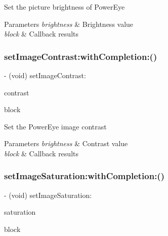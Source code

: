 Set the picture brightness of Power\+Eye


\begin{DoxyParams}{Parameters}
{\em brightness} & Brightness value \\
\hline
{\em block} & Callback results \\
\hline
\end{DoxyParams}
\mbox{\label{interface_p_v_camera_ab8dd6bc65ff3a01571c87a80bcb60b71}} 
\subsubsection{\texorpdfstring{set\+Image\+Contrast\+:with\+Completion\+:()}{setImageContrast:withCompletion:()}}
{\footnotesize\ttfamily -\/ (void) set\+Image\+Contrast\+: \begin{DoxyParamCaption}\item[{(N\+S\+Integer)}]{contrast }\item[{withCompletion:(P\+V\+Completion\+Block)}]{block }\end{DoxyParamCaption}}

Set the Power\+Eye image contrast


\begin{DoxyParams}{Parameters}
{\em brightness} & Contrast value \\
\hline
{\em block} & Callback results \\
\hline
\end{DoxyParams}
\mbox{\label{interface_p_v_camera_aa47631050d6132dd5b635af91aeede86}} 
\subsubsection{\texorpdfstring{set\+Image\+Saturation\+:with\+Completion\+:()}{setImageSaturation:withCompletion:()}}
{\footnotesize\ttfamily -\/ (void) set\+Image\+Saturation\+: \begin{DoxyParamCaption}\item[{(N\+S\+Integer)}]{saturation }\item[{withCompletion:(P\+V\+Completion\+Block)}]{block }\end{DoxyParamCaption}}

